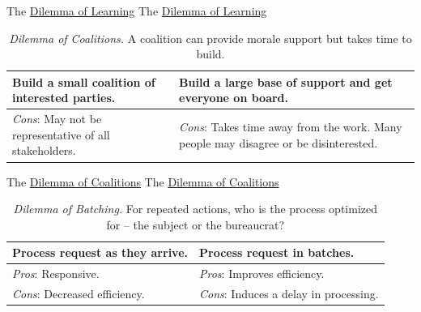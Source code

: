 The \href{table:lessons-learned-source}{Dilemma of Learning}
The \href{table:lessons-learned-source}{Dilemma of Learning}


\begin{center}
\begin{table}[H] %
\begin{tabular}{ | m{\dilemmatablewidth}| m{\dilemmatablewidth} | } 
  \hline
  \textbf{Build a small coalition of interested parties.} & 
  \textbf{Build a large base of support and get everyone on board.} \\ 
  \hline
  \textit{Cons}: May not be representative of all stakeholders. & 
  \textit{Cons}: Takes time away from the work. Many people may disagree or be disinterested. \\  
  \hline
\end{tabular}
\caption{
\textit{Dilemma of Coalitions.}
A coalition can provide morale support but takes time to build.
}
\label{table:how-to-change}
\end{table}
\end{center}


The \href{table:how-to-change}{Dilemma of Coalitions}
The \href{table:how-to-change}{Dilemma of Coalitions}


\begin{center}
\begin{table}[H] %
\begin{tabular}{ | m{\dilemmatablewidth}| m{\dilemmatablewidth} | } 
  \hline
  \textbf{Process request as they arrive.} &
  \textbf{Process request in batches.} \\
  \hline
  \textit{Pros}: Responsive. & 
  \textit{Pros}: Improves efficiency. \\
  \hline
  \textit{Cons}: Decreased efficiency. & 
  \textit{Cons}: Induces a delay in processing. \\
  \hline
\end{tabular}
\caption{
\textit{Dilemma of Batching.}
For repeated actions, who is the process optimized for -- the subject or the bureaucrat?
}
\label{table:dilemma-of-batching}
\end{table}
\end{center}


